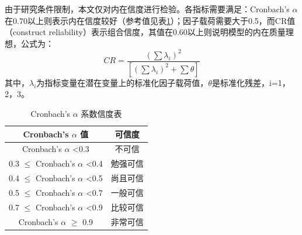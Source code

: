 由于研究条件限制，本文仅对内在信度进行检验。各指标需要满足：Cronbach's $\alpha$在0.70以上则表示内在信度较好（参考值见表\ref{tab:cronbach}）；因子载荷需要大于0.5，而CR值（construct reliability）表示组合信度，其值在0.60以上则说明模型的内在质量理想，公式为：
\begin{equation}
    CR=\frac{\left (  \sum \lambda _{i}\right )^{2}}{\left [\left (  \sum \lambda _{i}\right )^{2}+\sum \theta   \right ]}
\end{equation}
其中，$\lambda _{i}$为指标变量在潜在变量上的标准化因子载荷值，$\theta$是标准化残差，i=1，2，3。
\begin{table}[H]
\centering
\caption{Cronbach's $\alpha$ 系数信度表}
\label{tab:cronbach}
\begin{tabular}{@{}cc@{}}
\toprule
\textbf{Cronbach's $\alpha$ 值}              & \textbf{可信度} \\ \midrule
Cronbach's $\alpha$ \textless 0.3           & 不可信          \\
0.3 $\leq$ Cronbach's $\alpha$ \textless 0.4 & 勉强可信         \\
0.4 $\leq$ Cronbach's $\alpha$ \textless 0.5 & 尚且可信         \\
0.5 $\leq$ Cronbach's $\alpha$ \textless 0.7 & 一般可信         \\
0.7 $\leq$ Cronbach's $\alpha$ \textless 0.9 & 比较可信         \\
Cronbach's $\alpha$ $\geq$ 0.9               & 非常可信         \\ \bottomrule
\end{tabular}
\end{table}

